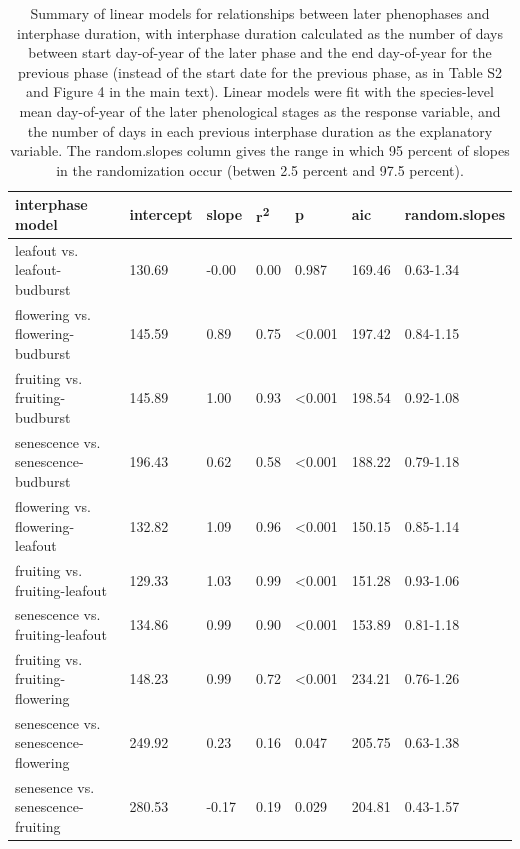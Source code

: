 \documentclass{article}
\begin{document}
\begin{table}[ht]
\centering
\caption{Summary of linear models for relationships between later phenophases and interphase duration, with interphase duration calculated as the number of days between start day-of-year of the later phase and the end day-of-year for the previous phase (instead of the start date for the previous phase, as in Table S2 and Figure 4 in the main text). Linear models were fit with the species-level mean day-of-year of the later phenological stages as the response variable, and the number of days in each previous interphase duration as the explanatory variable. The random.slopes column gives the range in which 95 percent of slopes in the randomization occur (betwen 2.5 percent and 97.5 percent).} 
\label{table:interphase_end}
\begin{tabular}{|p{}|p{}|p{}|p{}|p{}|p{}|p{}|}
  \hline
interphase model & intercept & slope & r\textsuperscript{2} & p & aic & random.slopes \\ 
  \hline
leafout vs. leafout-budburst & 130.69 & -0.00 & 0.00 & 0.987 & 169.46 & 0.63-1.34 \\ 
  flowering vs. flowering-budburst & 145.59 & 0.89 & 0.75 & <0.001 & 197.42 & 0.84-1.15 \\ 
  fruiting vs. fruiting-budburst & 145.89 & 1.00 & 0.93 & <0.001 & 198.54 & 0.92-1.08 \\ 
  senescence vs. senescence-budburst & 196.43 & 0.62 & 0.58 & <0.001 & 188.22 & 0.79-1.18 \\ 
  flowering vs. flowering-leafout & 132.82 & 1.09 & 0.96 & <0.001 & 150.15 & 0.85-1.14 \\ 
  fruiting vs. fruiting-leafout & 129.33 & 1.03 & 0.99 & <0.001 & 151.28 & 0.93-1.06 \\ 
  senescence vs. fruiting-leafout & 134.86 & 0.99 & 0.90 & <0.001 & 153.89 & 0.81-1.18 \\ 
  fruiting vs. fruiting-flowering & 148.23 & 0.99 & 0.72 & <0.001 & 234.21 & 0.76-1.26 \\ 
  senescence vs. senescence-flowering & 249.92 & 0.23 & 0.16 & 0.047 & 205.75 & 0.63-1.38 \\ 
  senesence vs. senescence-fruiting & 280.53 & -0.17 & 0.19 & 0.029 & 204.81 & 0.43-1.57 \\ 
   \hline
\end{tabular}
\end{table}\clearpage
\end{document}
